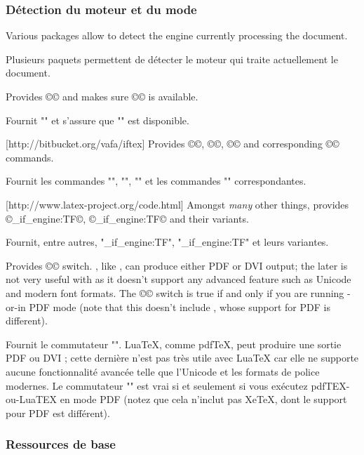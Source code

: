 \documentclass{lltxdoc}
\begin{document}
\subsubsection{Détection du moteur et du mode}\label{detect}

Various packages allow to detect the engine currently processing the document.

Plusieurs paquets permettent de détecter le moteur qui traite actuellement le document.

Provides ©\ifluatex© and makes sure ©\luatexversion© is available.

Fournit "\ifluatex" et s'assure que "\luatexversion" est disponible.

[http://bitbucket.org/vafa/iftex]
Provides ©\ifPDFTeX©, ©\ifXeTeX©, ©\ifLuaTeX© and corresponding ©\Require©
commands.

Fournit les commandes "\ifPDFTeX", "\ifXeTeX", "\ifLuaTeX" et les commandes "\Require" correspondantes.

[http://www.latex-project.org/code.html]
Amongst \emph{many} other things, provides ©\luatex_if_engine:TF©,
©\xetex_if_engine:TF© and their variants.

Fournit, entre autres, "\luatex_if_engine:TF", "\xetex_if_engine:TF" et leurs variantes.

Provides ©\ifpdf© switch. \luatex, like \pdftex, can produce either PDF or DVI
output; the later is not very useful with \luatex as it doesn't support any
advanced feature such as Unicode and modern font formats. The ©\ifpdf© switch
is true if and only if you are running \pdftex-or-\luatex in PDF mode (note
that this doesn't include \xetex, whose support for PDF is different).

Fournit le commutateur "\ifpdf". LuaTeX, comme pdfTeX, peut produire une sortie PDF ou DVI ; cette dernière n'est pas très utile avec LuaTeX car elle ne supporte aucune fonctionnalité avancée telle que l'Unicode et les formats de police modernes. Le commutateur "\ifpdf" est vrai si et seulement si vous exécutez pdfTEX-ou-LuaTEX en mode PDF (notez que cela n'inclut pas XeTeX, dont le support pour PDF est différent).

\subsubsection{Ressources de base}
\end{document}
